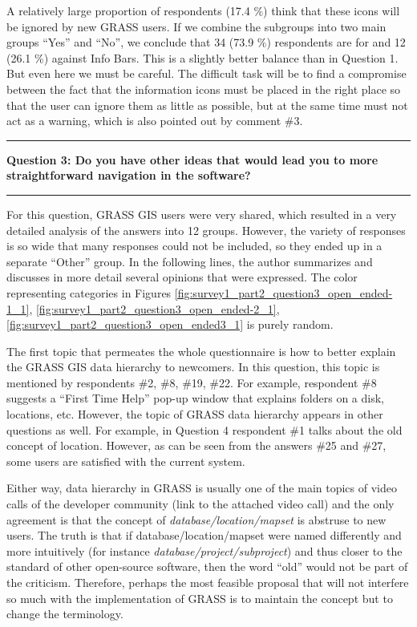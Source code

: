 \documentclass[a4paper,10pt,twoside]{article}
\begin{document}
\noindent A relatively large proportion of respondents (17.4 \%) think
that these icons will be ignored by new GRASS users. If we combine the
subgroups into two main groups ``Yes'' and ``No'', we conclude that 34
(73.9 \%) respondents are for and 12 (26.1 \%) against Info Bars. This
is a slightly better balance than in Question 1. But even here we must
be careful. The difficult task will be to find a compromise between
the fact that the information icons must be placed in the right place
so that the user can ignore them as little as possible, but at the
same time must not act as a warning, which is also pointed out by
comment \#3.

\par\noindent\rule{\textwidth}{0.4pt}
\noindent \textbf{Question 3: Do you have other ideas that would lead you to more straightforward navigation in the software?}
\par\noindent\rule{\textwidth}{0.4pt}
\noindent For this question, GRASS GIS users were very shared, which
resulted in a very detailed analysis of the answers into 12
groups. However, the variety of responses is so wide that many
responses could not be included, so they ended up in a separate
``Other'' group. In the following lines, the author summarizes and
discusses in more detail several opinions that were expressed. The
color representing categories in Figures
\ref{fig:survey1_part2_question3_open_ended-1_1},
\ref{fig:survey1_part2_question3_open_ended-2_1},
\ref{fig:survey1_part2_question3_open_ended3_1} is purely random.

The first topic that permeates the whole questionnaire is how to
better explain the GRASS GIS data hierarchy to newcomers. In this
question, this topic is mentioned by respondents \#2, \#8, \#19,
\#22. For example, respondent \#8 suggests a ``First Time Help''
pop-up window that explains folders on a disk, locations,
etc. However, the topic of GRASS data hierarchy appears in other
questions as well. For example, in Question 4 respondent \#1 talks
about the old concept of location. However, as can be seen from the
answers \#25 and \#27, some users are satisfied with the current
system.

Either way, data hierarchy in GRASS is usually one of the main topics
of video calls of the developer community (link to the attached video
call) and the only agreement is that the concept of
\textit{database/location/mapset} is abstruse to new users. The truth
is that if database/location/mapset were named differently and more
intuitively (for instance \textit{database/project/subproject}) and
thus closer to the standard of other open-source software, then the
word ``old'' would not be part of the criticism. Therefore, perhaps
the most feasible proposal that will not interfere so much with the
implementation of GRASS is to maintain the concept but to change the
terminology.
\end{document}
